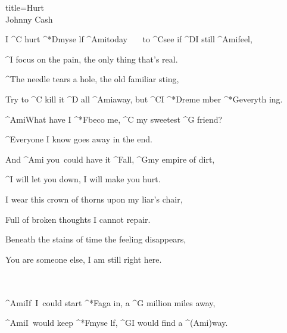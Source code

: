 \begin{song}{title=\predtitle\centering Hurt \\\large Johnny Cash \vspace*{-0.3cm}}  %
\begin{centerjustified}
\nejvetsi

\sloka
	I ^{C \z}hurt ^*{\z D}myse lf ^{\z Ami}today~~~ to ^{C}see if ^{D}I still ^{Ami}feel,

	^{\phantom{.}}I focus on the pain, the only thing that's real.

	^{\phantom{.}}The needle tears a hole, the old familiar sting,

	Try to ^{C \z}kill it ^{D} all ^{\z Ami}away, but ^{C}I ^*{\z D}reme mber ^*{\z G}everyth ing.


	^{Ami}What have I ^*{\z F}beco me, ^{C} my sweetest ^{G \z}friend?

	^{\phantom{.}}Everyone I know goes away in the end.

	And ^{Ami \z}you~could have it ^{F}all, ^{G}my empire of dirt,

	^{\phantom{.}}I will let you down, I will make you hurt.

\sloka
	I wear this crown of thorns upon my liar's chair,

	Full of broken thoughts I cannot repair.

	Beneath the stains of time the feeling disappears,

	You are someone else, I am still right here.


\\\\

	^{Ami\z}If~I~could start ^*{\z F}aga in, a ^{G \z}million miles away,

	^{Ami\z}I~would keep ^*{\z F}myse lf, ^{G}I would find a ^{(Ami)}way.

\end{centerjustified}

\centering
{}

\setcounter{Slokočet}{0}
\end{song}
